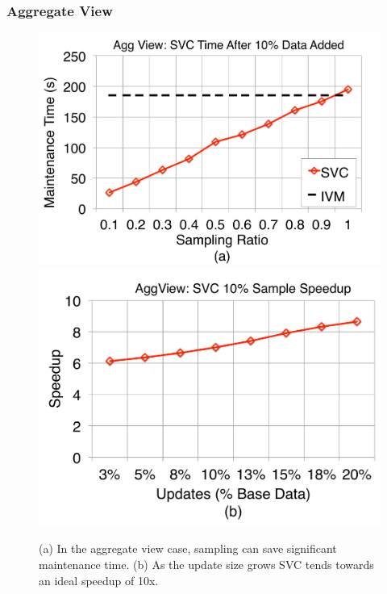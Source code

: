 \subsubsection{Aggregate View}
\label{exp-datacube}

\begin{figure}[t]
\centering
 \includegraphics[scale=0.15]{exp/msdc_1.pdf}
 \includegraphics[scale=0.15]{exp/msdc_2.pdf}
   \caption{(a) In the aggregate view case, sampling can save significant maintenance time. (b) As the update size grows SVC tends towards an ideal speedup of 10x.\label{exp2-acc-sample}}
\end{figure}


